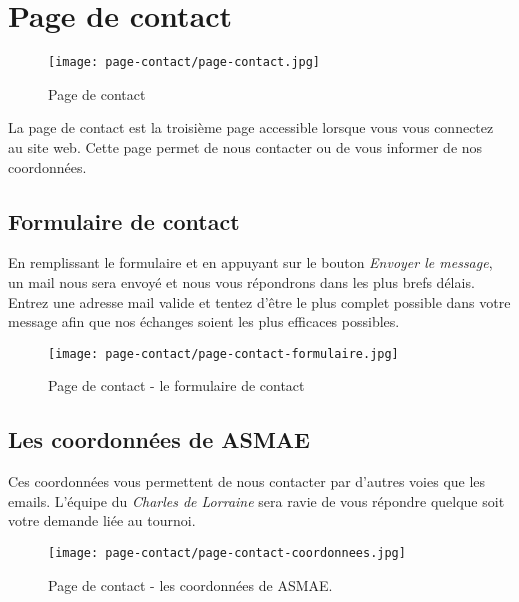 \section{Page de contact}

\begin{figure}[H]
\centering
\texttt{[image: page-contact/page-contact.jpg]}
\caption{Page de contact}
\end{figure}

La page de contact est la troisième page accessible lorsque vous vous connectez au site web. Cette page permet de nous contacter ou de vous informer de nos coordonnées.

\subsection{Formulaire de contact}

En remplissant le formulaire et en appuyant sur le bouton \textit{Envoyer le
message}, un mail nous sera envoyé et nous vous répondrons dans les plus brefs
délais. Entrez une adresse mail valide et tentez d'être le plus complet
possible dans votre message afin que nos échanges soient les plus efficaces
possibles.

\begin{figure}[H]
\centering
\texttt{[image: page-contact/page-contact-formulaire.jpg]}
\caption{Page de contact - le formulaire de contact}
\end{figure}

\subsection{Les coordonnées de ASMAE}

Ces coordonnées vous permettent de nous contacter par d'autres voies que les
emails. L'équipe du \textit{Charles de Lorraine} sera ravie de vous répondre quelque
soit votre demande liée au tournoi.

\begin{figure}[H]
\centering
\texttt{[image: page-contact/page-contact-coordonnees.jpg]}
\caption{Page de contact - les coordonnées de ASMAE.}
\end{figure}
